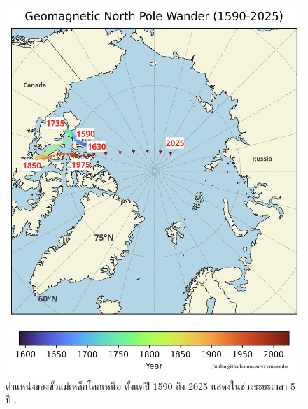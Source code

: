 \documentclass[10pt,twocolumn,letterpaper]{article}
\begin{document}
\begin{figure}[t]
\begin{center}
   \includegraphics[width=1\linewidth]{npw.jpg}
\end{center}

\caption{ตำแหน่งของขั้วแม่เหล็กโลกเหนือ ตั้งแต่ปี 1590 ถึง 2025 แสดงในช่วงระยะเวลา 5 ปี \cite{142}.}
\label{fig:13}
\label{fig:onecol}
\end{figure}
\end{document}
